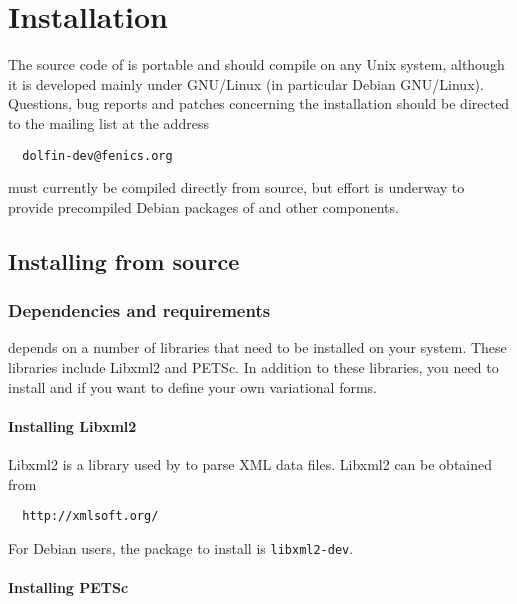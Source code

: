 \chapter{Installation}

The source code of \dolfin{} is portable and should compile on any
Unix system, although it is developed mainly under GNU/Linux
(in particular Debian GNU/Linux). Questions, bug reports and patches
concerning the installation should be directed to the
\dolfin{} mailing list at the address
\begin{verbatim}
  dolfin-dev@fenics.org
\end{verbatim}

\dolfin{} must currently be compiled directly from source, but effort
is underway to provide precompiled Debian packages of \dolfin{} and
other \fenics{} components.

\section{Installing from source}

\subsection{Dependencies and requirements}

\dolfin{} depends on a number of libraries that need to be installed on your
system. These libraries include Libxml2 and PETSc. In addition to these libraries,
you need to install \fiat{} and \ffc{} if you want to define your own variational forms.

\subsubsection{Installing Libxml2}

Libxml2 is a library used by \dolfin{} to parse XML data files. Libxml2 can be obtained from
\begin{verbatim}
  http://xmlsoft.org/
\end{verbatim}
For Debian users, the package to install is \texttt{libxml2-dev}.

\subsubsection{Installing PETSc}

